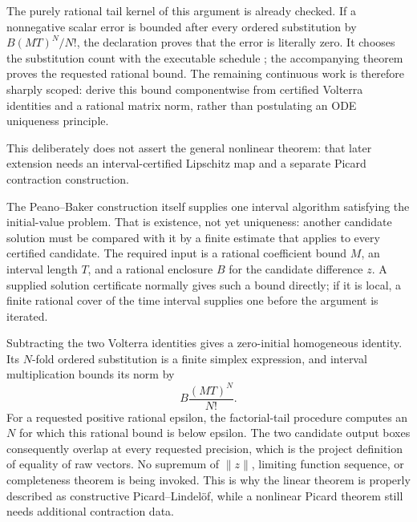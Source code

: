 \begin{theorem}
The purely rational tail kernel of this argument is already checked.  If a
nonnegative scalar error is bounded after every ordered substitution by
\(B(MT)^N/N!\), the declaration
 proves that the
error is literally zero.  It chooses the substitution count with the
executable schedule
; the accompanying theorem
 proves the requested
rational bound.  The remaining continuous work is therefore sharply scoped:
derive this bound componentwise from certified Volterra identities and a
rational matrix norm, rather than postulating an ODE uniqueness principle.

This deliberately does not assert the general nonlinear theorem: that later
extension needs an interval-certified Lipschitz map and a separate Picard
contraction construction.
\end{theorem}

\begin{remark}
\label{rem:peano-baker-uniqueness-certificate}
The Peano--Baker construction itself supplies one interval algorithm satisfying
the initial-value problem.  That is existence, not yet uniqueness: another
candidate solution must be compared with it by a finite estimate that applies
to every certified candidate.  The required input is a rational coefficient
bound \(M\), an interval length \(T\), and a rational enclosure \(B\) for the
candidate difference \(z\).  A supplied solution certificate normally gives
such a bound directly; if it is local, a finite rational cover of the time
interval supplies one before the argument is iterated.

Subtracting the two Volterra identities gives a zero-initial homogeneous
identity.  Its \(N\)-fold ordered substitution is a finite simplex expression,
and interval multiplication bounds its norm by
\[
  B\frac{(MT)^N}{N!}.
\]
For a requested positive rational epsilon, the factorial-tail procedure
computes an \(N\) for which this rational bound is below epsilon.  The two
candidate output boxes consequently overlap at every requested precision,
which is the project definition of equality of raw vectors.  No supremum of
\(\lVert z\rVert\), limiting function sequence, or completeness theorem is
being invoked.  This is why the linear theorem is properly described as
constructive Picard--Lindel\"of, while a nonlinear Picard theorem still needs
additional contraction data.
\end{remark}


